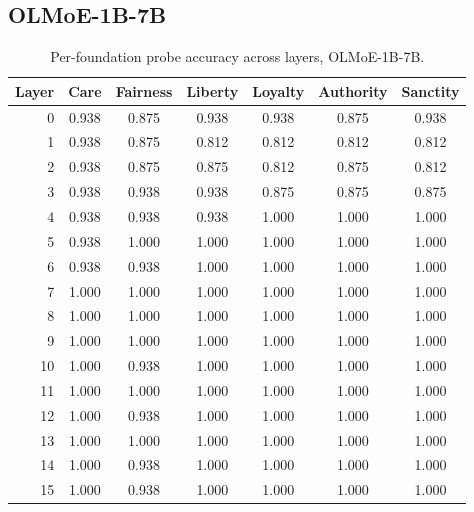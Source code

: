 \subsection{OLMoE-1B-7B}\label{a.2-olmoe-1b-7b}

\begin{table}[h]
\centering
\caption{Per-foundation probe accuracy across layers, OLMoE-1B-7B.}
\label{tab:accuracy_olmoe}
\small
\begin{tabular}{r cccccc}
\toprule
Layer & Care & Fairness & Liberty & Loyalty & Authority & Sanctity \\
\midrule
0  & 0.938 & 0.875 & 0.938 & 0.938 & 0.875 & 0.938 \\
1  & 0.938 & 0.875 & 0.812 & 0.812 & 0.812 & 0.812 \\
2  & 0.938 & 0.875 & 0.875 & 0.812 & 0.875 & 0.812 \\
3  & 0.938 & 0.938 & 0.938 & 0.875 & 0.875 & 0.875 \\
4  & 0.938 & 0.938 & 0.938 & 1.000 & 1.000 & 1.000 \\
5  & 0.938 & 1.000 & 1.000 & 1.000 & 1.000 & 1.000 \\
6  & 0.938 & 0.938 & 1.000 & 1.000 & 1.000 & 1.000 \\
7  & 1.000 & 1.000 & 1.000 & 1.000 & 1.000 & 1.000 \\
8  & 1.000 & 1.000 & 1.000 & 1.000 & 1.000 & 1.000 \\
9  & 1.000 & 1.000 & 1.000 & 1.000 & 1.000 & 1.000 \\
10 & 1.000 & 0.938 & 1.000 & 1.000 & 1.000 & 1.000 \\
11 & 1.000 & 1.000 & 1.000 & 1.000 & 1.000 & 1.000 \\
12 & 1.000 & 0.938 & 1.000 & 1.000 & 1.000 & 1.000 \\
13 & 1.000 & 1.000 & 1.000 & 1.000 & 1.000 & 1.000 \\
14 & 1.000 & 0.938 & 1.000 & 1.000 & 1.000 & 1.000 \\
15 & 1.000 & 0.938 & 1.000 & 1.000 & 1.000 & 1.000 \\
\bottomrule
\end{tabular}
\end{table}
